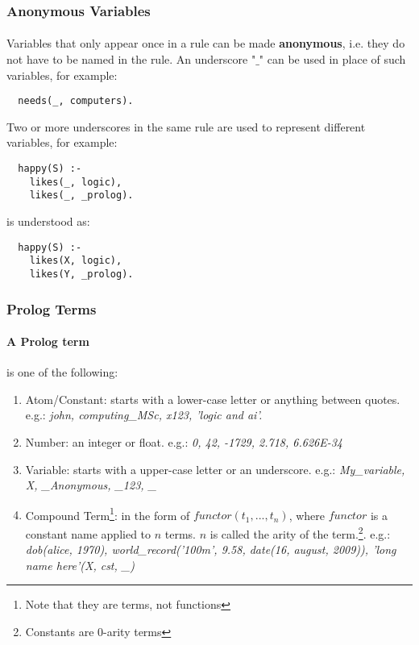 \documentclass{article}
\begin{document}
\begin{multicols}{2}
  \subsubsection{Anonymous Variables} 
  
  \paragraph{} Variables that only appear once in a rule can be made {\bf anonymous}, i.e. they do not have to be named in the rule. An underscore "$\_$" can be used in place of such variables, for example:
  
  \begin{lstlisting}
  needs(_, computers).
  \end{lstlisting}
  
  Two or more underscores in the same rule are used to represent different variables, for example:
  
  \begin{lstlisting}
  happy(S) :-
    likes(_, logic),
    likes(_, _prolog).
  \end{lstlisting}
  
  \noindent is understood as:
  
  \begin{lstlisting}
  happy(S) :-
    likes(X, logic),
    likes(Y, _prolog).
  \end{lstlisting}
  
  \subsubsection{Prolog Terms}
  
  \paragraph{A Prolog term} is one of the following:
  
  \begin{enumerate}
  \item Atom/Constant: starts with a lower-case letter or anything between quotes. e.g.: \textit{john, computing\_MSc, x123, 'logic and ai'.}
  \item Number: an integer or float. e.g.: \textit{0, 42, -1729, 2.718, 6.626E-34}
  \item Variable: starts with a upper-case letter or an underscore. e.g.: \textit{My\_variable, X, \_Anonymous, \_123, \_} 
  \item Compound Term\footnote{Note that they are terms, not functions}: in the form of $functor(t_1,..., t_n)$, where $functor$ is a constant name applied to $n$ terms. $n$ is called the arity of the term.\footnote{Constants are 0-arity terms}. e.g.: \textit{dob(alice, 1970), world\_record('100m', 9.58, date(16, august, 2009)), 'long name here'(X, cst, \_)}
  \end{enumerate}
  

\end{multicols}
\end{document}
